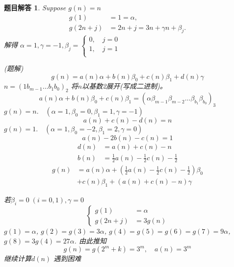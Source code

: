 \documentclass[mode=geye, chinesefont=founder]{elegantnote}
\newtheorem{answer}{题目解答}
\begin{document}
\begin{answer}
	Suppose $ g(n) = n $
	\begin{equation*}
		\begin{aligned}
			g(1) 	&= 1 = \alpha,\\
			g(2n+j)	&= 2n+j = 3n+\gamma n+\beta_j.
		\end{aligned}
	\end{equation*}
解得 $   \alpha = 1, \gamma = -1, \beta_j = \left\{ \begin{array}{l}
	0,\quad j=0\\
	1,\quad j=1\\
\end{array}\right.$

(题解)
\begin{equation*}
	g(n) = a(n)\alpha + b(n)\beta_0 + c(n)\beta_1+d(n)\gamma
\end{equation*}
$ n = (1 b_{m-1}\dots b_1b_0)_2 $ 将$ n $以基数2展开(写成二进制)。\\
\begin{equation*}
	a(n)\alpha + b(n)\beta_0 + c(n)\beta_1 =  (\alpha\beta_{m-1}\beta_{m-2}\dots\beta_{b_1}\beta_{b_0})_3
\end{equation*}
$ g(n) = n.\quad (\alpha=1,\beta_0 = 0,\beta_1=1,  \gamma = -1 )$ 
\begin{equation*}
	a(n)+c(n)-d(n)=n
\end{equation*}
$ g(n)=1. \quad (\alpha=1,\beta_0 = -2,\beta_1=2, \gamma = 0)  $ 
\begin{equation*}
	a(n)-2b(n)-c(n)=1
\end{equation*}
\begin{align*}
	d(n)&=a(n)+c(n)-n\\
	b(n)&=\frac{1}{2}a(n)-\frac{1}{2}c(n)-\frac{1}{2}  
\end{align*}
\begin{align*}
	g(n)&=a(n)\alpha+(\frac{1}{2}a(n)-\frac{1}{2}c(n)-\frac{1}{2})\beta_0 \\
	&+ c(n)\beta_1 + (a(n)+c(n)-n)\gamma
\end{align*}

若$ \beta_i=0\;(i=0,1), \gamma=0 $ 
\begin{equation*}
	\left\{
		\begin{aligned}
			g(1)&=\alpha\\
			g(2n+j)&=3g(n)
		\end{aligned}
	\right.
\end{equation*}
$ g(1)=\alpha $, $ g(2)=g(3)=3\alpha $, $ g(4)=g(5)=g(6)=g(7)= 9\alpha $, 
$ g(8)=3g(4)=27\alpha $.
由此推知
\begin{equation*}
	g(n)=g(2^m+k)=3^m,\quad a(n)=3^m
\end{equation*}
继续计算$ d(n) $ 遇到困难


\end{answer}
\end{document}
